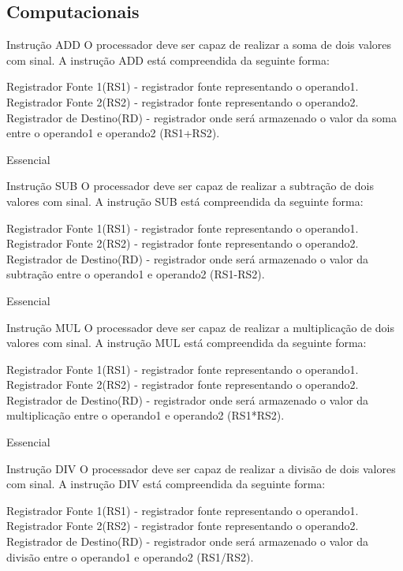 \documentclass{article}
\begin{document}
    \subsection{Computacionais}
    \begin{functional}

     \requirement
      {Instrução ADD}
      {O processador deve ser capaz de realizar a soma de dois valores com sinal.
      A instrução ADD está compreendida da seguinte forma:}
       
        { Registrador Fonte 1(RS1) - registrador fonte representando o operando1.}
        { Registrador Fonte 2(RS2) - registrador fonte representando o operando2.}
        { Registrador de Destino(RD) - registrador onde será armazenado o valor da soma entre o operando1 e operando2 (RS1+RS2).}
       
      {Essencial}

     \requirement
      {Instrução SUB}
      {O processador deve ser capaz de realizar a subtração de dois valores com sinal.
      A instrução SUB está compreendida da seguinte forma:}
       
        { Registrador Fonte 1(RS1) - registrador fonte representando o operando1.}
        { Registrador Fonte 2(RS2) - registrador fonte representando o operando2.}
        { Registrador de Destino(RD) - registrador onde será armazenado o valor da subtração entre o operando1 e operando2 (RS1-RS2).}
       
      {Essencial}

      \requirement
      {Instrução MUL}
      {O processador deve ser capaz de realizar a multiplicação de dois valores com sinal.
      A instrução MUL está compreendida da seguinte forma:}
       
        { Registrador Fonte 1(RS1) - registrador fonte representando o operando1.}
        { Registrador Fonte 2(RS2) - registrador fonte representando o operando2.}
        { Registrador de Destino(RD) - registrador onde será armazenado o valor da multiplicação entre o operando1 e operando2 (RS1*RS2).}
       
      {Essencial}

       \requirement
      {Instrução DIV}
      {O processador deve ser capaz de realizar a divisão de dois valores com sinal.
      A instrução DIV está compreendida da seguinte forma:}
       
        { Registrador Fonte 1(RS1) - registrador fonte representando o operando1.}
        { Registrador Fonte 2(RS2) - registrador fonte representando o operando2.}
        { Registrador de Destino(RD) - registrador onde será armazenado o valor da divisão entre o operando1 e operando2 (RS1/RS2).}
       

\end{functional}
\end{document}
